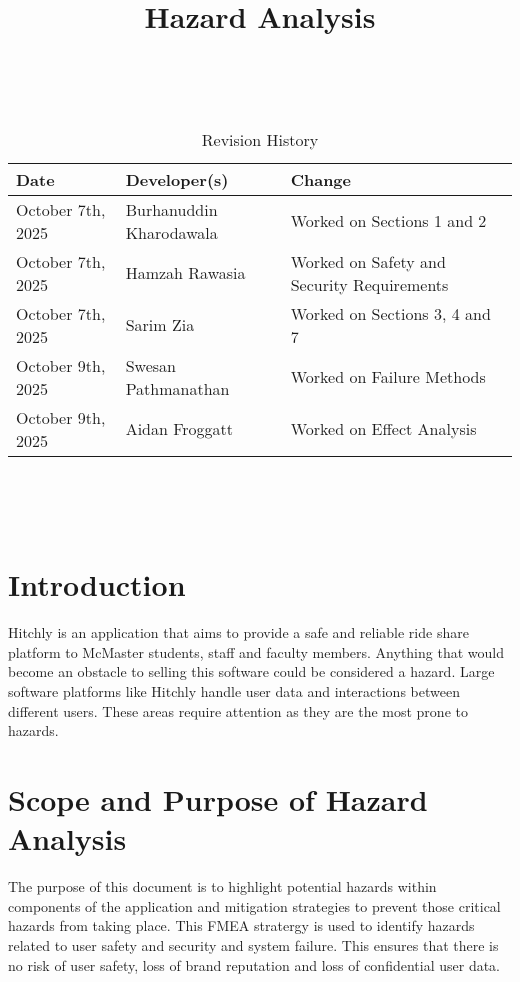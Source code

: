 \documentclass{article}
\title{Hazard Analysis\\\progname}
\author{\authname}
\date{}
\begin{document}
\maketitle
\thispagestyle{empty}

~\newpage


\begin{table}[hp]
\caption{Revision History} \label{TblRevisionHistory}
\begin{tabularx}{\textwidth}{llX}
\toprule
\textbf{Date} & \textbf{Developer(s)} & \textbf{Change}\\
\midrule
October 7th, 2025 & Burhanuddin Kharodawala & Worked on Sections 1 and 2\\
October 7th, 2025 & Hamzah Rawasia & Worked on Safety and Security Requirements\\
October 7th, 2025 & Sarim Zia & Worked on Sections 3, 4 and 7\\
October 9th, 2025 & Swesan Pathmanathan & Worked on Failure Methods\\
October 9th, 2025 & Aidan Froggatt & Worked on Effect Analysis\\
\bottomrule
\end{tabularx}
\end{table}

~\newpage

\tableofcontents

~\newpage


\section{Introduction}
Hitchly is an application that aims to provide a safe and reliable ride share platform to McMaster students, staff and faculty members. Anything that would become an obstacle to selling this software could be considered a hazard. Large software platforms like Hitchly handle user data and interactions between different users. These areas require attention as they are the most prone to hazards.  

\section{Scope and Purpose of Hazard Analysis}
The purpose of this document is to highlight potential hazards within components of the application and mitigation strategies to prevent those critical hazards from taking place. This FMEA stratergy is used to identify hazards related to user safety and security and system failure. This ensures that there is no risk of user safety, loss of brand reputation and loss of confidential user data. 
\end{document}
